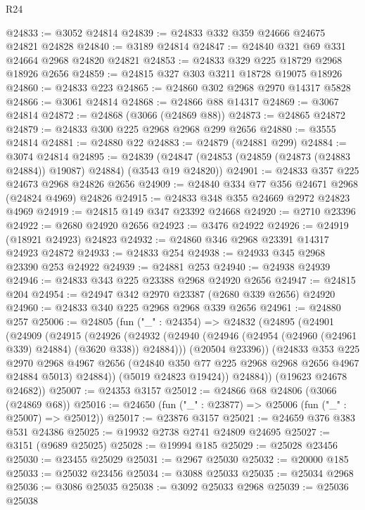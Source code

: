 \begin{lexlean}{R24}
\begin{coremodule}
@24833 := @3052 @24814
@24839 := @24833 @332 @359 @24666 @24675 @24821 @24828
@24840 := @3189 @24814
@24847 := @24840 @321 @69 @331 @24664 @2968 @24820 @24821
@24853 := @24833 @329 @225 @18729 @2968 @18926 @2656
@24859 := @24815 @327 @303 @3211 @18728 @19075 @18926
@24860 := @24833 @223
@24865 := @24860 @302 @2968 @2970 @14317 @5828
@24866 := @3061 @24814
@24868 := @24866 @88 @14317
@24869 := @3067 @24814
@24872 := @24868 (@3066 (@24869 @88))
@24873 := @24865 @24872
@24879 := @24833 @300 @225 @2968 @2968 @299 @2656
@24880 := @3555 @24814
@24881 := @24880 @22
@24883 := @24879 (@24881 @299)
@24884 := @3074 @24814
@24895 := @24839
    (@24847 (@24853 (@24859 (@24873 (@24883 @24884)) @19087) @24884) (@3543 @19 @24820))
@24901 := @24833 @357 @225 @24673 @2968 @24826 @2656
@24909 := @24840 @334 @77 @356 @24671 @2968 (@24824 @4969) @24826
@24915 := @24833 @348 @355 @24669 @2972 @24823 @4969
@24919 := @24815 @149 @347 @23392 @24668
@24920 := @2710 @23396
@24922 := @2680 @24920 @2656
@24923 := @3476 @24922
@24926 := @24919 (@18921 @24923) @24823
@24932 := @24860 @346 @2968 @23391 @14317 @24923 @24872
@24933 := @24833 @254
@24938 := @24933 @345 @2968 @23390 @253 @24922
@24939 := @24881 @253
@24940 := @24938 @24939
@24946 := @24833 @343 @225 @23388 @2968 @24920 @2656
@24947 := @24815 @204
@24954 := @24947 @342 @2970 @23387 (@2680 @339 @2656) @24920
@24960 := @24833 @340 @225 @2968 @2968 @339 @2656
@24961 := @24880 @257
@25006 := @24805
    (fun ("_" : @24354) =>
    @24832
      (@24895
        (@24901
          (@24909
            (@24915
              (@24926
                (@24932
                  (@24940 (@24946 (@24954 (@24960 (@24961 @339) @24884) (@3620 @338)) @24884)))
                (@20504 @23396))
              (@24833
                @353
                @225
                @2970
                @2968
                @4967
                @2656
                (@24840 @350 @77 @225 @2968 @2968 @2656 @4967 @24884 @5013)
                @24884))
            (@5019 @24823 @19424))
          @24884))
      (@19623 @24678 @24682))
@25007 := @24353 @3157
@25012 := @24866 @68 @24806 (@3066 (@24869 @68))
@25016 := @24650 (fun ("_" : @23877) => @25006 (fun ("_" : @25007) => @25012))
@25017 := @23876 @3157
@25021 := @24659 @376 @383 @531 @24386
@25025 := @19932 @2738 @2741 @24809 @24695
@25027 := @3151 (@9689 @25025)
@25028 := @19994 @185
@25029 := @25028 @23456
@25030 := @23455 @25029
@25031 := @2967 @25030
@25032 := @20000 @185
@25033 := @25032 @23456
@25034 := @3088 @25033
@25035 := @25034 @2968
@25036 := @3086 @25035
@25038 := @3092 @25033 @2968
@25039 := @25036 @25038

\end{coremodule}
\end{lexlean}
